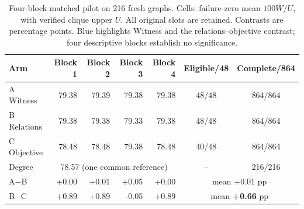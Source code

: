 \begin{table}[t]
\centering
\caption{Four-block matched pilot on 216 fresh graphs. Cells: failure-zero mean $100W/U$, with verified clique upper $U$. All original slots are retained. Contrasts are percentage points. Blue highlights Witness and the relations--objective contrast; four descriptive blocks establish no significance.}
\label{tab:matched-llm}
\setlength{\tabcolsep}{6pt}
\begin{tabular}{lrrrrcc}
\toprule
Arm & Block 1 & Block 2 & Block 3 & Block 4 & Eligible/48 & Complete/864 \\
\midrule
\rowcolor{blue!7} A Witness & 79.38 & 79.39 & 79.38 & 79.38 & 48/48 & 864/864 \\
B Relations & 79.38 & 79.38 & 79.33 & 79.38 & 48/48 & 864/864 \\
C Objective & 78.48 & 78.48 & 79.38 & 78.48 & 40/48 & 864/864 \\
Degree & \multicolumn{4}{c}{78.57 (one common reference)} & -- & 216/216 \\
\midrule
A$-$B & +0.00 & +0.01 & +0.05 & +0.00 & \multicolumn{2}{c}{mean +0.01 pp} \\
\rowcolor{blue!7} B$-$C & +0.89 & +0.89 & -0.05 & +0.89 & \multicolumn{2}{c}{mean \textbf{+0.66} pp} \\
\bottomrule
\end{tabular}
\end{table}
